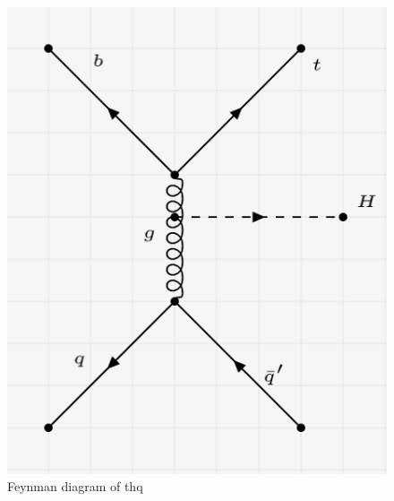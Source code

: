 \begin{figure}[H]
    \centering
    \includegraphics[scale =0.5]{figure_1/thq.png}
    \caption{Feynman diagram of thq}
    \label{fig:my_label_thq}
\end{figure}




